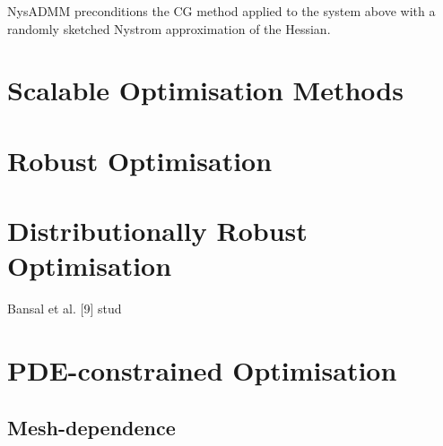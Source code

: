 NysADMM preconditions the CG method applied to the system above
with a randomly sketched Nystrom approximation of the Hessian.

\section{Scalable Optimisation Methods}

\section{Robust Optimisation}

\section{Distributionally Robust Optimisation}



    
     Bansal et al. [9] stud 

\section{PDE-constrained Optimisation}


\subsection{Mesh-dependence}


